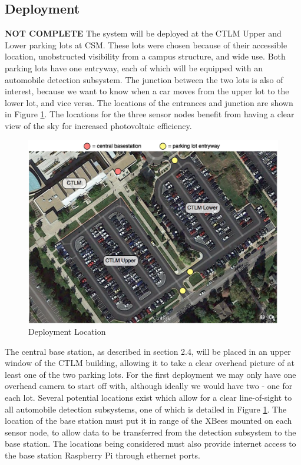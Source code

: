 \documentclass[11pt, oneside, fullpage, doublespace]{article}
\begin{document}
\subsection{Deployment}
{\color{red}\textbf{NOT COMPLETE}}
The system will be deployed at the CTLM Upper and Lower parking lots at CSM. These lots were chosen because of their accessible location, unobstructed visibility from a campus structure, and wide use. Both parking lots have one entryway, each of which will be equipped with an automobile detection subsystem. The junction between the two lots is also of interest, because we want to know when a car moves from the upper lot to the lower lot, and vice versa. The locations of the entrances and junction are shown in Figure \ref{fig:deployment}. The locations for the three sensor nodes benefit from having a clear view of the sky for increased photovoltaic efficiency.
\begin{figure}
\begin{center}
\includegraphics[width=5in]{deployment}
\end{center}
\caption{Deployment Location}
\label{fig:deployment}
\end{figure}

The central base station, as described in section 2.4, will be placed in an upper window of the CTLM building, allowing it to take a clear overhead picture of at least one of the two parking lots. For the first deployment we may only have one overhead camera to start off with, although ideally we would have two - one for each lot. Several potential locations exist which allow for a clear line-of-sight to all automobile detection subsystems, one of which is detailed in Figure \ref{fig:deployment}. The location of the base station must put it in range of the XBees mounted on each sensor node, to allow data to be transferred from the detection subsystem to the base station. The locations being considered must also provide internet access to the base station Raspberry Pi through ethernet ports.
\end{document}

